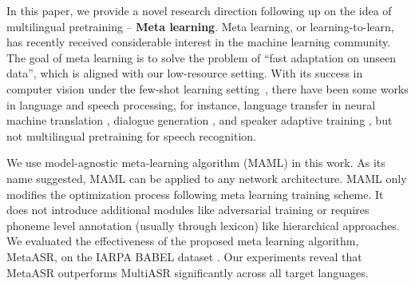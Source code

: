 In this paper, we provide a novel research direction following up on the idea of multilingual pretraining -- \textbf{Meta learning}. 
Meta learning, or learning-to-learn, has recently received considerable interest in the machine learning community. The goal of meta learning is to solve the problem of ``fast adaptation on unseen data'', which is aligned with our low-resource setting.
 With its success in computer vision under the few-shot learning setting~\cite{rusu2018meta, snell2017prototypical, vinyals2016matching}, there have been some works in language and speech processing, for instance, language transfer in neural machine translation \cite{gu2018meta}, dialogue generation \cite{mi2019meta}, and speaker adaptive training \cite{klejch2018learning}, but not multilingual pretraining for speech recognition.

We use model-agnostic meta-learning algorithm (MAML) \cite{finn2017model} in this work. 
As its name suggested, MAML can be applied to any network architecture. 
MAML only modifies the optimization process following meta learning training scheme.
It does not introduce additional modules like adversarial training or requires phoneme level annotation (usually through lexicon) like hierarchical approaches. 
We evaluated the effectiveness of the proposed meta learning algorithm, MetaASR, on the IARPA BABEL dataset \cite{gales2014speech}. Our experiments reveal that MetaASR outperforms MultiASR significantly across all target languages.